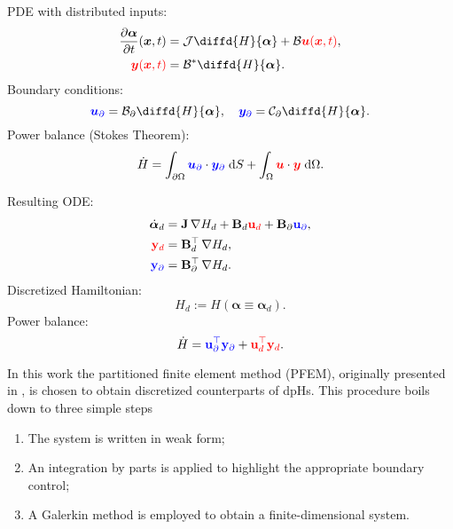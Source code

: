 \begin{tcbraster}[raster columns=2, raster equal height]
\begin{tcolorbox}[width=0.4\textwidth, nobeforeafter, colframe=theme,title=Infinite dimensional pH system]%
	PDE with distributed inputs:
	\begin{align*}
	\diffp{\bm{\alpha}}{t}(\bm{x}, t) &= \mathcal{J} {\displaystyle \diffd{H}{\bm{\alpha}}}+ \mathcal{B} \textcolor{red}{\bm{u}(\bm{x}, t)}, \\
	\textcolor{red}{\bm{y}(\bm{x}, t)} &= \mathcal{B}^* {\displaystyle \diffd{H}{\bm{\alpha}}}.
	\end{align*}
	Boundary conditions: 
	\[\textcolor{blue}{\bm{u}_\partial} = \mathcal{B}_\partial{\displaystyle \diffd{H}{\bm{\alpha}}}, \quad \textcolor{blue}{\bm{y}_\partial} = \mathcal{C}_\partial {\displaystyle \diffd{H}{\bm{\alpha}}}. \]
	Power balance (Stokes Theorem): 
	\[ \dot{H} = \displaystyle \int_{\partial \Omega} \textcolor{blue}{\bm{u}_\partial} \cdot \textcolor{blue}{\bm{y}_\partial} \d{S} +  \int_{\Omega} \textcolor{red}{\bm{u}} \cdot \textcolor{red}{\bm{y}} \d{\Omega}.
	\]
\end{tcolorbox} 
\begin{tcolorbox}[width=0.4\textwidth, nobeforeafter,  colframe=theme,title=Structure-preserving discretization]%
	Resulting ODE:
	\begin{align*}
	\dot{\bm{\alpha}}_d &= \mathbf{J} \, {\nabla {H}_d} + \mathbf{B}_d \textcolor{red}{\mathbf{u}_d} + \mathbf{B}_\partial \textcolor{blue}{\mathbf{u}_\partial}, \\
	\textcolor{red}{\mathbf{y}_d} &= \mathbf{B}_d^\top \, {\nabla {H}_d}, \\
	\textcolor{blue}{\mathbf{y}_\partial} &= \mathbf{B}_\partial^\top \,{\nabla {H}_d}.
	\end{align*}
	Discretized Hamiltonian:
	\[
	H_d := H(\bm{\alpha} \equiv \bm{\alpha}_d).
	\]
	Power balance: 
	\[ \dot{H} = \textcolor{blue}{\mathbf{u}_\partial^\top \mathbf{y}_\partial} +  \textcolor{red}{\mathbf{u}_d^\top \mathbf{y}_d}.
	\]
\end{tcolorbox}
\end{tcbraster}
\vspace{.5cm}
In this work the partitioned finite element method (PFEM), originally presented in \cite{cardoso2018pfem,cardoso2019partitioned}, is chosen to obtain discretized counterparts of dpHs. This procedure boils down to three simple steps
\begin{enumerate}
	\item The system is written in weak form; 
	\item An integration by parts is applied to highlight the appropriate boundary control;
	\item A Galerkin method is employed to obtain a finite-dimensional system.
\end{enumerate}

